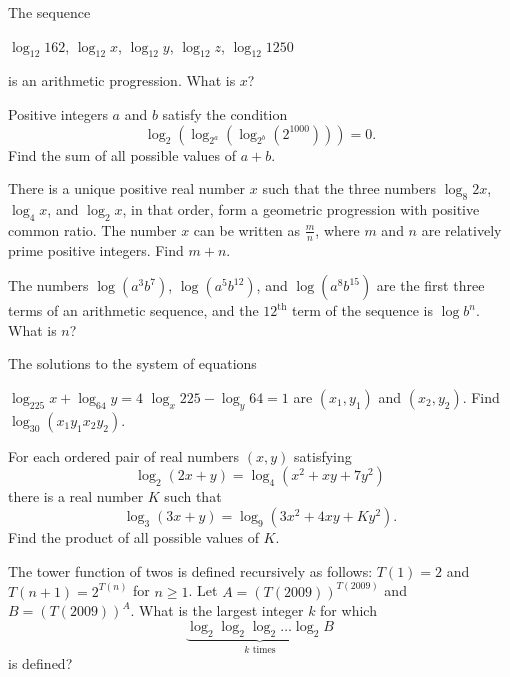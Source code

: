 \documentclass[sexy]{scrartcl}
\begin{document}
\begin{problem}[AMC 12A 2013/14]
The sequence

\noindent $\log_{12}{162}$, $\log_{12}{x}$, $\log_{12}{y}$, $\log_{12}{z}$, $\log_{12}{1250}$

\noindent is an arithmetic progression. What is $x$?
\end{problem} %

\begin{problem}[AIME II 2013/2]
Positive integers $a$ and $b$ satisfy the condition\[\log_2(\log_{2^a}(\log_{2^b}(2^{1000}))) = 0.\]Find the sum of all possible values of $a+b$.
\end{problem} %

\begin{problem}[AIME I 2020/2]
There is a unique positive real number $x$ such that the three numbers $\log_8{2x}$, $\log_4{x}$, and $\log_2{x}$, in that order, form a geometric progression with positive common ratio. The number $x$ can be written as $\frac{m}{n}$, where $m$ and $n$ are relatively prime positive integers. Find $m + n$.
\end{problem} %

\begin{problem}[AMC 12A 2008/16]
The numbers $\log(a^3b^7)$, $\log(a^5b^{12})$, and $\log(a^8b^{15})$ are the first three terms of an arithmetic sequence, and the $12^\text{th}$ term of the sequence is $\log{b^n}$. What is $n$?
\end{problem} %

\begin{problem}[AIME I 2002/6]
The solutions to the system of equations

$\log_{225}x+\log_{64}y=4$
$\log_{x}225-\log_{y}64=1$
are $(x_1,y_1)$ and $(x_2,y_2)$. Find $\log_{30}\left(x_1y_1x_2y_2\right)$.
\end{problem} %

\begin{problem}[AIME I 2018/5]
For each ordered pair of real numbers $(x,y)$ satisfying\[\log_2(2x+y) = \log_4(x^2+xy+7y^2)\]there is a real number $K$ such that\[\log_3(3x+y) = \log_9(3x^2+4xy+Ky^2).\]Find the product of all possible values of $K$.
\end{problem} %

\begin{problem}[AMC 12A 2009/24]
The tower function of twos is defined recursively as follows: $T(1) = 2$ and $T(n + 1) = 2^{T(n)}$ for $n\ge1$. Let $A = (T(2009))^{T(2009)}$ and $B = (T(2009))^A$. What is the largest integer $k$ for which\[\underbrace{\log_2\log_2\log_2\ldots\log_2B}_{k\text{ times}}\]is defined?
\end{problem} %
\end{document}
